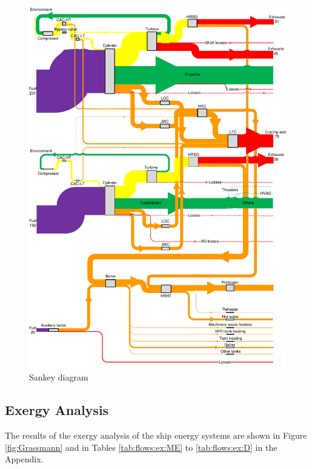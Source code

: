 \documentclass[preprint,12pt]{elsarticle}
\begin{document}
\begin{figure}
	\centering
	\includegraphics[width=0.95\linewidth]{Figures/Sankey_diagram_energy_ship_v9}
	\caption{Sankey diagram}
	\label{fig:Sankey}
\end{figure}





\subsection{Exergy Analysis} \label{sec:res:exergy}

The results of the exergy analysis of the ship energy systems are shown in Figure \ref{fig:Grassmann} and in Tables \ref{tab:flows:ex:ME} to \ref{tab:flows:ex:D} in the Appendix. 
\end{document}
